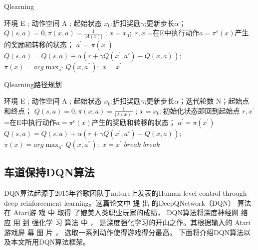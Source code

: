 \begin{algorithm}[H]  
  \caption{Qlearning}  
  \begin{algorithmic}[1] 
    \Require 环境 E ; 动作空间 A ;
     起始状态 $x_0$;折扣奖励$\gamma $;更新步长$\alpha $；
    \Ensure 
    \State $Q(s,a)=0,\pi(x,a)=\frac{1}{|A(x)|} $ ;
    \State $x=x_0;$
    \State $r,x^{'}$=在E中执行动作$a=\pi^{\epsilon}(x)$产生的奖励和转移的状态；
    \State $a^{'}=\pi(x^{'})$
    \State $Q(s,a)=Q(s,a)+\alpha (r+\gamma Q(x^{'},a{'})-Q(x,a));$
    \State $\pi(x)=arg\max_{a^{''}}Q(x,a^{''});$
    \State $x=x^{'}$
    \EndFor   
  \end{algorithmic}  
\end{algorithm}

\begin{algorithm}[H]  
  \caption{Qlearning路径规划}  
  \begin{algorithmic}[1] 
    \Require 环境 E ; 动作空间 A ;
     起始状态 $x_0$;折扣奖励$\gamma $;更新步长$\alpha $；迭代轮数 N；起始点和终点；
    \Ensure 
    \State $Q(s,a)=0,\pi(x,a)=\frac{1}{|A(x)|} $ ;
    \State $x=x_0;$初始化状态即回到起始点
    \State $r,x^{'}$=在E中执行动作$a=\pi^{\epsilon}(x)$产生的奖励和转移的状态；
    \State $a^{'}=\pi(x^{'})$
    \State $Q(s,a)=Q(s,a)+\alpha (r+\gamma Q(x^{'},a{'})-Q(x,a));$
    \State $\pi(x)=arg\max_{a^{''}}Q(x,a^{''});$
    \State $x=x^{'}$
    \State $break$
    \EndIf
    \State $break$
    \EndIf
    \EndFor
    \EndFor   
  \end{algorithmic}  
\end{algorithm}



\subsection{车道保持DQN算法}
DQN算法起源于2015年谷歌团队于nature上发表的Human-level control through deep reinforcement
learning。这篇论文中 提 出 的DeepQNetwork（DQN） 算法在
Atari游 戏 中 取得 了媲美人类职业玩家的成绩， DQN算法将深度神经网 络 应
用 到 强化学 习 算法 中 ， 是深度强化学习的开山之作。其根据输入的 Atari 游戏屏 幕 图 片 ， 选取一系列动作使得游戏得分最高。 下面将介绍DQN算法以及本文所用DQN算法框架。

